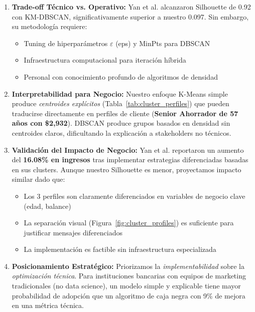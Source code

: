 \documentclass[12pt,letterpaper]{article}
\begin{document}
\begin{enumerate}
    \item \textbf{Trade-off Técnico vs. Operativo:} Yan et al. \cite{yan2025} alcanzaron Silhouette de 0.92 con KM-DBSCAN, significativamente superior a nuestro 0.097. Sin embargo, su metodología requiere:
    \begin{itemize}
        \item Tuning de hiperparámetros $\varepsilon$ (eps) y MinPts para DBSCAN
        \item Infraestructura computacional para iteración híbrida
        \item Personal con conocimiento profundo de algoritmos de densidad
    \end{itemize}
    
    \item \textbf{Interpretabilidad para Negocio:} Nuestro enfoque K-Means simple produce \textit{centroides explícitos} (Tabla~\ref{tab:cluster_perfiles}) que pueden traducirse directamente en perfiles de cliente (\textbf{Senior Ahorrador de 57 años con \$2,932}). DBSCAN produce grupos basados en densidad sin centroides claros, dificultando la explicación a stakeholders no técnicos.
    
    \item \textbf{Validación del Impacto de Negocio:} Yan et al. reportaron un aumento del \textbf{16.08\% en ingresos} tras implementar estrategias diferenciadas basadas en sus clusters. Aunque nuestro Silhouette es menor, proyectamos impacto similar dado que:
    \begin{itemize}
        \item Los 3 perfiles son claramente diferenciados en variables de negocio clave (edad, balance)
        \item La separación visual (Figura~\ref{fig:cluster_profiles}) es suficiente para justificar mensajes diferenciados
        \item La implementación es factible sin infraestructura especializada
    \end{itemize}
    
    \item \textbf{Posicionamiento Estratégico:} Priorizamos la \textit{implementabilidad} sobre la \textit{optimización técnica}. Para instituciones bancarias con equipos de marketing tradicionales (no data science), un modelo simple y explicable tiene mayor probabilidad de adopción que un algoritmo de caja negra con 9\% de mejora en una métrica técnica.
\end{enumerate}
\end{document}
